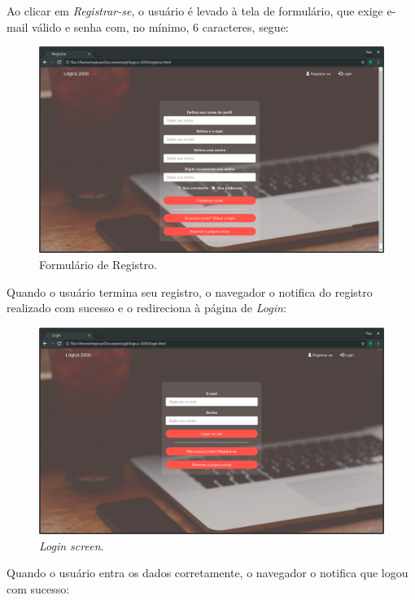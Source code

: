 \documentclass[11pt, a4paper]{article}
\begin{document}
				\pagebreak

			Ao clicar em \emph{Registrar-se}, o usuário é levado à tela de formulário, que exige e-mail válido e senha com, no mínimo, 6 caracteres, segue:

				\begin{figure}[!h]
					\centering
					\includegraphics[scale=.32]{print3.png}
					\caption{Formulário de Registro.}
				\end{figure}

			Quando o usuário termina seu registro, o navegador o notifica do registro realizado com sucesso e o redireciona à página de \emph{Login}:

				\begin{figure}[!h]
					\centering
					\includegraphics[scale=.32]{print4.png}
					\caption{\emph{Login screen}.}
				\end{figure}

				\pagebreak

			Quando o usuário entra os dados corretamente, o navegador o notifica que logou com sucesso:
\end{document}
